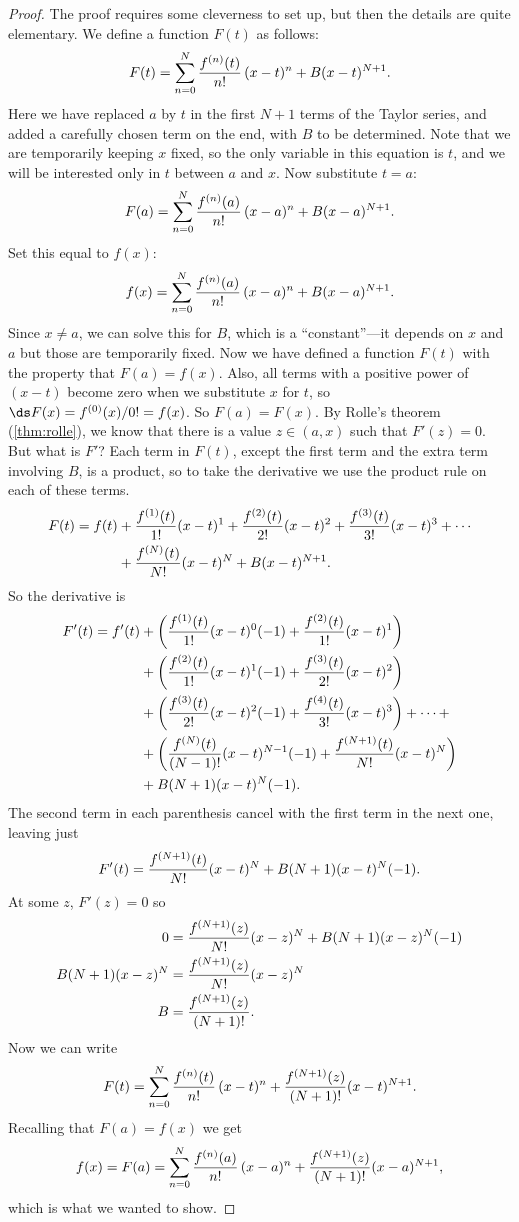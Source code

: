 \begin{proof}
The proof requires some cleverness to set up, but then the details are
quite elementary. We define a function $F(t)$ as follows:
$$F(t)=\sum_{n=0}^N{f^{(n)}(t)\over n!}\,(x-t)^n + B(x-t)^{N+1}.$$
Here we have replaced $a$ by $t$ in the first $N+1$ terms of the
Taylor series, and added a carefully chosen term on the end, with $B$
to be determined. Note that
we are temporarily keeping $x$ fixed, so the only variable in this
equation is $t$, and we will be interested
only in $t$ between $a$ and $x$. Now substitute $t=a$:
$$F(a)=\sum_{n=0}^N{f^{(n)}(a)\over n!}\,(x-a)^n + B(x-a)^{N+1}.$$
Set this equal to $f(x)$:
$$f(x)=\sum_{n=0}^N{f^{(n)}(a)\over n!}\,(x-a)^n + B(x-a)^{N+1}.$$
Since $x\not=a$, we can solve this for $B$, which is a
``constant''---it depends on $x$ and $a$ but those are temporarily 
fixed.  Now we
have defined a function $F(t)$ with the property that
$F(a)=f(x)$. Also, all terms with a positive power of
$(x-t)$ become zero when we substitute $x$ for $t$, so
$\ds F(x)=f^{(0)}(x)/0!=f(x)$. So $F(a)=F(x)$. 
By Rolle's theorem (\ref{thm:rolle}), we
know that there is a value $z\in(a,x)$ such that $F'(z)=0$. But what is $F'$?
Each term in $F(t)$, except the first term and the extra
term involving $B$, is a product, so to take the derivative we use the
product rule on each of these terms.
\begin{align*}
  F(t)=f(t)&+{f^{(1)}(t)\over 1!}(x-t)^1+{f^{(2)}(t)\over 2!}(x-t)^2+{f^{(3)}(t)\over 3!}(x-t)^3+\cdots	\\
  &+{f^{(N)}(t)\over N!}(x-t)^N+B(x-t)^{N+1}.
\end{align*}
So the derivative is
\begin{align*}
	  F'(t) = f'(t) &+\left({f^{(1)}(t)\over 1!}(x-t)^0(-1)+{f^{(2)}(t)\over 1!}(x-t)^1\right)	\\
  &+\left({f^{(2)}(t)\over 1!}(x-t)^1(-1)+{f^{(3)}(t)\over 2!}(x-t)^2\right)	\\
  &+\left({f^{(3)}(t)\over 2!}(x-t)^2(-1)+{f^{(4)}(t)\over 3!}(x-t)^3\right)+\dots+	\\
  &+\left({f^{(N)}(t)\over (N-1)!}(x-t)^{N-1}(-1)+{f^{(N+1)}(t)\over N!}(x-t)^N\right)	\\
  &+B(N+1)(x-t)^N(-1).
\end{align*}
The second term in each parenthesis cancel with the first term in the next one,
leaving just
$$F'(t) = {f^{(N+1)}(t)\over N!}(x-t)^N+B(N+1)(x-t)^N(-1).$$
At some $z$, $F'(z)=0$ so
\begin{align*}
  0&={f^{(N+1)}(z)\over N!}(x-z)^N+B(N+1)(x-z)^N(-1)	\\
  B(N+1)(x-z)^N&={f^{(N+1)}(z)\over N!}(x-z)^N	\\
  B&={f^{(N+1)}(z)\over (N+1)!}.
\end{align*}
Now we can write 
$$
  F(t)=\sum_{n=0}^N{f^{(n)}(t)\over n!}\,(x-t)^n + 
  {f^{(N+1)}(z)\over (N+1)!}(x-t)^{N+1}.
$$
Recalling that $F(a)=f(x)$ we get
$$
  f(x)=F(a)=\sum_{n=0}^N{f^{(n)}(a)\over n!}\,(x-a)^n + 
  {f^{(N+1)}(z)\over (N+1)!}(x-a)^{N+1},
$$
which is what we wanted to show.
\end{proof}

